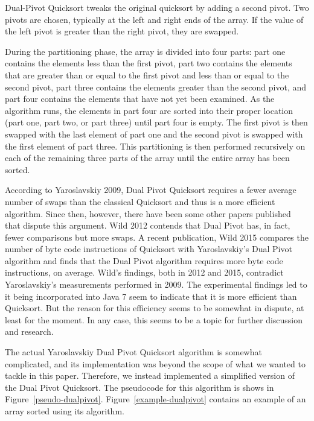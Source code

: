 \documentclass{article}
\begin{document}
Dual-Pivot Quicksort tweaks the original quicksort by adding a second pivot. Two pivots are chosen, 
typically at the left and right ends of the array. If the value of the left pivot is greater than the right 
pivot, they are swapped.  

During the partitioning phase, the array is divided into four parts:
part one contains the elements less than the first pivot, part two contains the elements that are 
greater than or equal to the first pivot and less than or equal to the second pivot, part three contains 
the elements greater than the second pivot, and part four contains the elements that have not
yet been examined. As the algorithm runs, the elements in part four are sorted into their proper
location (part one, part two, or part three) until part four is empty. The first pivot is then swapped 
with the last element of part one and the second pivot is swapped with the first element of part 
three. This partitioning is then performed recursively on each of the remaining three parts of the 
array until the entire array has been sorted. 

According to Yaroslavskiy 2009\cite{Yaroslavskiy09}, Dual Pivot Quicksort requires a fewer 
average number of swaps than the classical Quicksort and thus is a more efficient algorithm.
Since then, however, there have been some other papers published that dispute this argument.
Wild 2012\cite{Wild12} contends that Dual Pivot has, in fact, fewer comparisons but 
more swaps. A recent publication, Wild 2015\cite{Wild15} compares the number of byte code
instructions of Quicksort with Yaroslavskiy's Dual Pivot algorithm and finds that the Dual Pivot
algorithm requires more byte code instructions, on average. Wild's findings, both in 2012 and 2015,
contradict Yaroslavskiy's measurements performed in 2009. The experimental findings led
to it being incorporated into Java 7 seem to indicate that it is more efficient than Quicksort. But
the reason for this efficiency seems to be somewhat in dispute, at least for the moment.
In any case, this seems to be a topic for further discussion and research.

The actual Yaroslavskiy Dual Pivot Quicksort algorithm is somewhat complicated, and
its implementation was beyond the scope of what we wanted to tackle in this paper. Therefore,
we instead implemented a simplified version of the Dual Pivot Quicksort. The pseudocode for
this algorithm is shows in Figure~\ref{pseudo-dualpivot}. Figure~\ref{example-dualpivot} contains 
an example of an array sorted using its algorithm.
\end{document}
